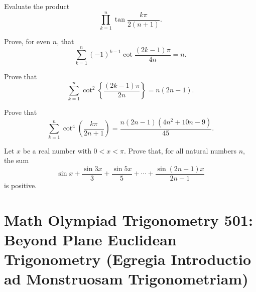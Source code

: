 \begin{question} Evaluate the product
\[ \prod_{k=1}^{n}\tan\frac{k\pi}{2(n+1)}.\]
\end{question}

\begin{question} Prove, for even $n$, that $$\sum_{k=1}^{n}(-1)^{k-1}\cot\frac{(2k-1)\pi}{4n}=n.$$
\end{question}

\begin{question} Prove that $$\sum_{k=1}^{n}\cot^{2}\left\{\frac{(2k-1)\pi}{2n}\right\}=n(2n-1).$$
\end{question}


\begin{question} Prove that $$\sum_{k=1}^{n}\cot^{4}\left(\frac{k\pi}{2n+1}\right)=\frac{n(2n-1)(4n^{2}+10n-9)}{45}.$$
\end{question}



\begin{question} 
     Let $x$ be a real number with $0<x<\pi$. Prove that, for all natural numbers $n$, the sum $$\sin x + \frac{\sin 3x}{3} + \frac{\sin 5x}{5}+\cdots+ \frac{\sin (2n-1)x}{2n-1}$$ is positive.
\end{question}


\newpage

\section{Math Olympiad Trigonometry 501:  Beyond Plane Euclidean Trigonometry (Egregia Introductio ad Monstruosam Trigonometriam)}\label{sec:MonsterTrigonometry}


